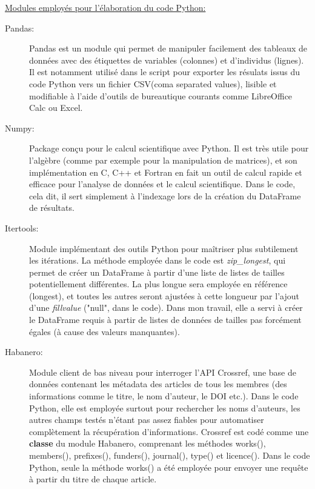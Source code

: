 \documentclass{book}
\begin{document}
\vspace{\baselineskip}

\noindent
\underline{Modules employés pour l'élaboration du code Python:}

\begin{description}
    \item[Pandas:] Pandas est un module qui permet de manipuler facilement des
        tableaux de données avec des étiquettes de variables (colonnes) et d'individus
        (lignes). Il est notamment utilisé dans le script pour exporter les résulats
        issus du code Python vers un fichier CSV(coma separated values), lisible et
        modifiable à l'aide d'outils de bureautique courants comme LibreOffice Calc ou
        Excel.

    \item[Numpy:] Package conçu pour le calcul scientifique avec Python. Il est
        très utile pour l'algèbre (comme par exemple pour la manipulation de matrices),
        et son implémentation en C, C++ et Fortran en fait un outil de calcul rapide et
        efficace pour l'analyse de données et le calcul scientifique. Dans le code,
        cela dit, il sert simplement à l'indexage lors de la création du DataFrame de
        résultats.

    \item[Itertools:] Module implémentant des outils Python pour maîtriser plus
        subtilement les itérations. La méthode employée dans le code est
        \textit{zip\_longest}, qui permet de créer un DataFrame à partir d'une liste de
        listes de tailles potentiellement différentes. La plus longue sera employée en
        référence (longest), et toutes les autres seront ajustées à cette longueur par
        l'ajout d'une \textit{fillvalue} ("null", dans le code). Dans mon travail, elle
        a servi à créer le DataFrame requis à partir de listes de données de tailles
        pas forcément égales (à cause des valeurs manquantes).

    \item[Habanero:] Module client de bas niveau pour interroger l'API
        Crossref, une base de données contenant les métadata des articles de tous les
        membres (des informations comme le titre, le nom d'auteur, le DOI etc.). Dans
        le code Python, elle est employée surtout pour rechercher les noms d'auteurs,
        les autres champs testés n'étant pas assez fiables pour automatiser
        complètement la récupération d'informations. Crossref est codé comme une
        \textbf{classe} du module Habanero, comprenant les méthodes works(), members(),
        prefixes(), funders(), journal(), type() et licence(). Dans le code Python,
        seule la méthode works() a été employée pour envoyer une requête à partir du
        titre de chaque article.


\end{description}
\end{document}
